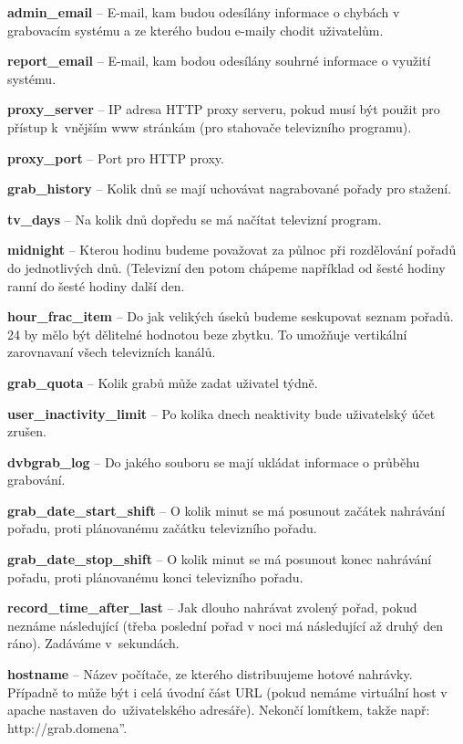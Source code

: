 \item\textbf{admin\_email} -- E-mail, kam budou odesílány informace o chybách v grabovacím systému a ze kterého budou e-maily chodit uživatelům.
\item\textbf{report\_email} -- E-mail, kam bodou odesílány souhrné informace o využití systému.
\item\textbf{proxy\_server} -- IP adresa HTTP proxy serveru, pokud musí být použit pro přístup k~vnějším www stránkám (pro stahovače televizního programu).
\item\textbf{proxy\_port} -- Port pro HTTP proxy.
\item\textbf{grab\_history} -- Kolik dnů se mají uchovávat nagrabované pořady pro stažení.
\item\textbf{tv\_days} -- Na kolik dnů dopředu se má načítat televizní program.
\item\textbf{midnight} -- Kterou hodinu budeme považovat za půlnoc při rozdělování pořadů do jednotlivých dnů. (Televizní den potom chápeme například od šesté hodiny ranní do šesté hodiny další den.
\item\textbf{hour\_frac\_item} -- Do jak velikých úseků budeme seskupovat seznam pořadů. 24 by mělo být dělitelné hodnotou beze zbytku. To umožňuje vertikální zarovnavaní všech televizních kanálů.
\item\textbf{grab\_quota} -- Kolik grabů může zadat uživatel týdně.
\item\textbf{user\_inactivity\_limit} -- Po kolika dnech neaktivity bude uživatelský účet zrušen.
\item\textbf{dvbgrab\_log} -- Do jakého souboru se mají ukládat informace o průběhu grabování.
\item\textbf{grab\_date\_start\_shift} -- O kolik minut se má posunout začátek nahrávání pořadu, proti plánovanému začátku televizního pořadu.
\item\textbf{grab\_date\_stop\_shift} -- O kolik minut se má posunout konec nahrávání pořadu, proti plánovanému konci televizního pořadu.
\item\textbf{record\_time\_after\_last} -- Jak dlouho nahrávat zvolený pořad, pokud neznáme následující (třeba poslední pořad v noci má následující až druhý den ráno). Zadáváme v~sekundách.
\item\textbf{hostname} -- Název počítače, ze kterého distribuujeme hotové nahrávky. Případně to může být i celá úvodní část URL (pokud nemáme virtuální host v apache nastaven do~uživatelského adresáře). Nekončí lomítkem, takže např: \quotedblbase http://grab.domena''.
